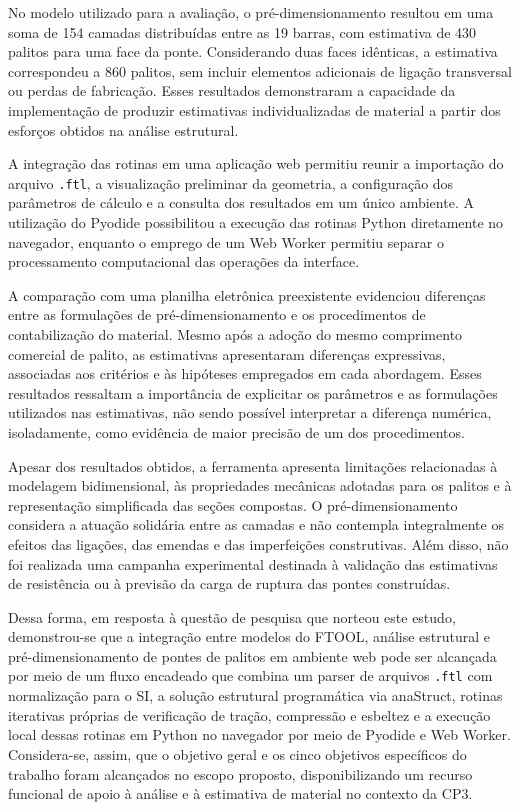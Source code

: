 No modelo utilizado para a avaliação, o pré-dimensionamento resultou em uma soma de 154 camadas distribuídas entre as 19 barras, com estimativa de 430 palitos para uma face da ponte. Considerando duas faces idênticas, a estimativa correspondeu a 860 palitos, sem incluir elementos adicionais de ligação transversal ou perdas de fabricação. Esses resultados demonstraram a capacidade da implementação de produzir estimativas individualizadas de material a partir dos esforços obtidos na análise estrutural.

A integração das rotinas em uma aplicação web permitiu reunir a importação do arquivo \texttt{.ftl}, a visualização preliminar da geometria, a configuração dos parâmetros de cálculo e a consulta dos resultados em um único ambiente. A utilização do Pyodide possibilitou a execução das rotinas Python diretamente no navegador, enquanto o emprego de um Web Worker permitiu separar o processamento computacional das operações da interface.

A comparação com uma planilha eletrônica preexistente evidenciou diferenças entre as formulações de pré-dimensionamento e os procedimentos de contabilização do material. Mesmo após a adoção do mesmo comprimento comercial de palito, as estimativas apresentaram diferenças expressivas, associadas aos critérios e às hipóteses empregados em cada abordagem. Esses resultados ressaltam a importância de explicitar os parâmetros e as formulações utilizados nas estimativas, não sendo possível interpretar a diferença numérica, isoladamente, como evidência de maior precisão de um dos procedimentos.

Apesar dos resultados obtidos, a ferramenta apresenta limitações relacionadas à modelagem bidimensional, às propriedades mecânicas adotadas para os palitos e à representação simplificada das seções compostas. O pré-dimensionamento considera a atuação solidária entre as camadas e não contempla integralmente os efeitos das ligações, das emendas e das imperfeições construtivas. Além disso, não foi realizada uma campanha experimental destinada à validação das estimativas de resistência ou à previsão da carga de ruptura das pontes construídas.

Dessa forma, em resposta à questão de pesquisa que norteou este estudo, demonstrou-se que a integração entre modelos do \acrshort{FTOOL}, análise estrutural e pré-dimensionamento de pontes de palitos em ambiente web pode ser alcançada por meio de um fluxo encadeado que combina um parser de arquivos \texttt{.ftl} com normalização para o \gls{SI}, a solução estrutural programática via anaStruct, rotinas iterativas próprias de verificação de tração, compressão e esbeltez e a execução local dessas rotinas em Python no navegador por meio de Pyodide e Web Worker. Considera-se, assim, que o objetivo geral e os cinco objetivos específicos do trabalho foram alcançados no escopo proposto, disponibilizando um recurso funcional de apoio à análise e à estimativa de material no contexto da \acrshort{CP3}.

